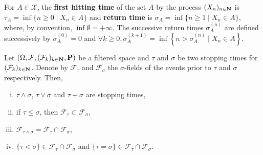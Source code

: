 	\begin{defn}
		For $A \in \mathcal{X}$, the \textbf{first hitting time} of the set $A$ by the process $(X_n)_{n \in \mathbf{N}}$ is $\tau_A = \inf \{ n \geq 0 \mid X_n \in A \}$ and \textbf{return time} is $\sigma_A = \inf \{ n \geq 1 \mid X_n \in A \}$, where, by convention, $\inf \emptyset = + \infty$.
		The successive return times $\sigma_A^{(n)}$ are defined successively by $\sigma_A^{(0)} = 0$ and $\forall k \geq 0, \sigma_A^{(k + 1)} = \inf \left\{ n > \sigma_A^{(n)} \mid X_n \in A \right\}$.
	\end{defn}

	\begin{pop}
		Let $(\Omega, \mathcal{F}, (\mathcal{F}_k)_{k \in \mathbf{N}}, \mathbf{P})$ be a filtered space and $\tau$ and $\sigma$ be two stopping times for $(\mathcal{F}_k)_{k \in \mathbf{N}}$.
		Denote by $\mathcal{F}_\tau$ and $\mathcal{F}_\sigma$ the $\sigma$-fields of the events prior to $\tau$ and $\sigma$ respectively.
		Then,
		\begin{enumerate}[(i)]
			\item $\tau \wedge \sigma$, $\tau \vee \sigma$ and $\tau + \sigma$ are stopping times,
			\item if $\tau \leq \sigma$, then $\mathcal{F}_\tau \subset \mathcal{F}_\sigma$,
			\item $\mathcal{F}_{\tau \wedge \sigma} = \mathcal{F}_\tau \cap \mathcal{F}_\sigma$,
			\item $\{ \tau < \sigma \} \in \mathcal{F}_\tau \cap \mathcal{F}_\sigma$ and $\{ \tau = \sigma \} \in \mathcal{F}_\tau \cap \mathcal{F}_\sigma$.
		\end{enumerate}
	\end{pop}
